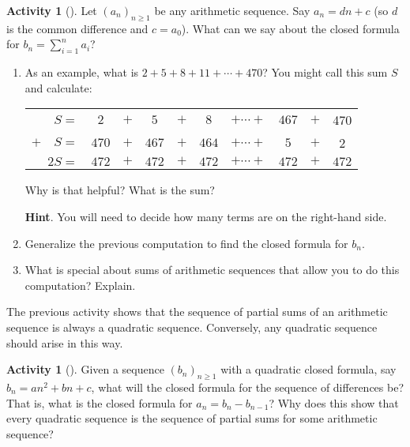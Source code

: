 \documentclass[10pt,]{book}
\theoremstyle{plain}
\theoremstyle{definition}
\theoremstyle{definition}
\theoremstyle{definition}
\newtheorem{activity}[project]{Activity}
\numberwithin{equation}{chapter}
\newcommand{\hrulethin}  {\noalign{\hrule height 0.04em}}
\begin{document}
\begin{activity}[]\label{activity-139}
\hypertarget{p-938}{}%
Let \((a_n)_{n \ge 1}\) be any arithmetic sequence.  Say \(a_n = dn + c\) (so \(d\) is the common difference and \(c = a_0\)).  What can we say about the closed formula for \(b_n = \sum_{i=1}^n a_i\)?%
\begin{enumerate}[font=\bfseries,label=(\alph*),ref=\alph*]
\item\label{task-177} \hypertarget{p-939}{}%
As an example, what is \(2+5+8+11+\cdots + 470\)?  You might call this sum \(S\) and calculate:%
\begin{sidebyside}{1}{0}{0}{0}
\begin{sbspanel}{1}
{\centering%
\begin{tabular}{rccccccccc}
\(S  =\)&\(2\)&\(+\)&\(5\)&\(+\)&\(8\)&\(+ \cdots +\)&\(467\)&\(+\)&470\tabularnewline[0pt]
\(+ \quad S  =\)&\(470\)&\(+\)&\(467\)&\(+\)&\(464\)&\(+ \cdots +\)&\(5\)&\(+\)&2\tabularnewline\hrulethin
\(2S  =\)&\(472\)&\(+\)&\(472\)&\(+\)&\(472\)&\(+ \cdots +\)&\(472\)&\(+\)&\(472\)
\end{tabular}
\par}
\end{sbspanel}
\end{sidebyside}
\par
\hypertarget{p-940}{}%
Why is that helpful?  What is the sum?%
\par\smallskip%
\noindent\textbf{Hint}.\hypertarget{hint-105}{}\quad%
\hypertarget{p-941}{}%
You will need to decide how many terms are on the right-hand side.%
\item\label{task-178} \hypertarget{p-942}{}%
Generalize the previous computation to find the closed formula for \(b_n\).%
\item\label{task-179} \hypertarget{p-943}{}%
What is special about sums of arithmetic sequences that allow you to do this computation?  Explain.%
\end{enumerate}
\end{activity}
\hypertarget{p-944}{}%
The previous activity shows that the sequence of partial sums of an arithmetic sequence is always a quadratic sequence.  Conversely, any quadratic sequence should arise in this way.%
\begin{activity}[]\label{activity-140}
\hypertarget{p-945}{}%
Given a sequence \((b_n)_{n \ge 1}\) with a quadratic closed formula, say \(b_n = an^2 + bn + c\), what will the closed formula for the sequence of differences be?  That is, what is the closed formula for \(a_n = b_n - b_{n-1}\)?  Why does this show that every quadratic sequence is the sequence of partial sums for some arithmetic sequence?%
\end{activity}
\end{document}
